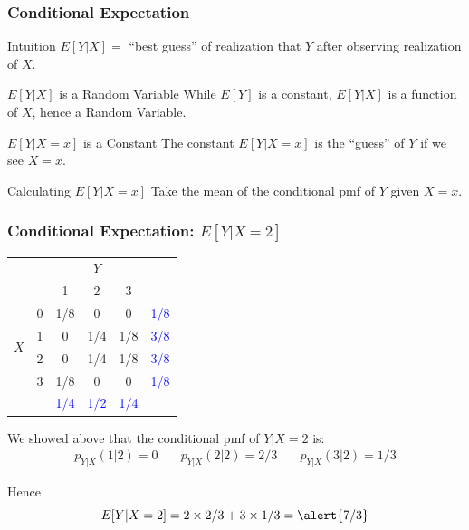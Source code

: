 \documentclass[handout]{beamer}
\begin{document}
\begin{frame}
\frametitle{Conditional Expectation}
\begin{block}{Intuition}
	$E[Y|X] = $ ``best guess'' of realization that $Y$ after observing realization of $X$. 
\end{block}

\begin{block}{$E[Y|X]$ is a Random Variable}
While $E[Y]$ is a constant, $E[Y|X]$ is a function of $X$, hence a \alert{Random Variable}.
\end{block}

\begin{block}{$E[Y|X=x]$ is a Constant}
  The constant $E[Y|X=x]$ is the ``guess'' of $Y$ if we see $X=x$.
\end{block}

\begin{block}{Calculating $E[Y|X=x]$}
Take the mean of the conditional pmf of $Y$ given $X=x$.
\end{block}

\end{frame}
\begin{frame}
	\frametitle{Conditional Expectation: $E[Y|X=2]$}

\footnotesize
\begin{table}
\begin{tabular}{|cc|ccc|c|}
\hline
&&\multicolumn{3}{c|}{$Y$}&\\
&&1 & 2&3&\\
\hline
\multirow{4}{*}{$X$}
&0& \multicolumn{1}{|c}{\alert{1/8}} & \alert{0}& \alert{0}&\textcolor{blue}{1/8}\\
&1& \multicolumn{1}{|c}{\alert{0}} & \alert{1/4}&\alert{1/8}&\textcolor{blue}{3/8}\\
&2& \multicolumn{1}{|c}{\alert{0}} & \alert{1/4}&\alert{1/8}&\textcolor{blue}{3/8}\\
&3& \multicolumn{1}{|c}{\alert{1/8}} & \alert{0}&\alert{0}&\textcolor{blue}{1/8}\\
\hline
&&\textcolor{blue}{1/4}&\textcolor{blue}{1/2}&\textcolor{blue}{1/4}&\\
\hline
\end{tabular}
\end{table}

We showed above that the conditional pmf of $Y|X=2$ is:
	$$\boxed{\begin{array}{ccc}p_{Y|X}(1|2) =0 \quad&p_{Y|X}(2|2) =2/3 \quad&p_{Y|X}(3|2) =1/3\end{array}}$$
	
	
Hence
	$$E[Y|X=2] = 2 \times 2/3 + 3 \times 1/3 =  \alert{7/3}$$

\end{frame}
\end{document}
